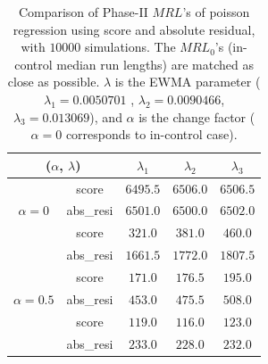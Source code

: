 \documentclass[twoside,11pt]{article}
\begin{document}
\begin{table}[!t]
\centering
\begin{tabular}{ccccc}
\toprule
\multicolumn{2}{c}{($ \alpha$, $ \lambda$)} & {$ \lambda_1$} & {$ \lambda_2$} & {$ \lambda_3$} \\
\midrule
\multirow{3}{*}{$\alpha=0$} & score &$6495.5$ & $6506.0$ & $6506.5$ \\
& abs\_resi &$6501.0$ & $6500.0$ & $6502.0$ \\
\midrule
\multirow{3}{*}{$\alpha=0.3$} & score &$\bm{321.0}$ & $\bm{381.0}$ & $\bm{460.0}$ \\
& abs\_resi &$1661.5$ & $1772.0$ & $1807.5$ \\
\midrule
\multirow{3}{*}{$\alpha=0.5$} & score &$\bm{171.0}$ & $\bm{176.5}$ & $\bm{195.0}$ \\
& abs\_resi &$453.0$ & $475.5$ & $508.0$ \\
\midrule
\multirow{3}{*}{$\alpha=0.7$} & score &$\bm{119.0}$ & $\bm{116.0}$ & $\bm{123.0}$ \\
& abs\_resi &$233.0$ & $228.0$ & $232.0$ \\
\midrule
\end{tabular}
\caption{Comparison of Phase-II $MRL$'s of poisson regression using score and absolute residual, with $10000$ simulations. The $MRL_0$'s (in-control median run lengths) are matched as close as possible. $ \lambda$ is the EWMA parameter ({$ \lambda_1=0.0050701$} , {$ \lambda_2=0.0090466$}, {$ \lambda_3=0.013069$}), and $\alpha$ is the change factor ($ \alpha=0$ corresponds to in-control case).}
\label{tab:pois_MRL}
\end{table}
\end{document}
